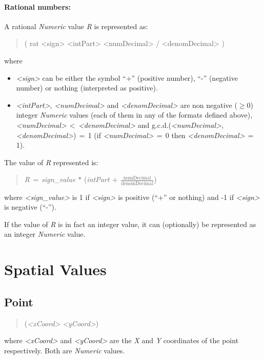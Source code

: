 \documentclass[english,a4paper]{article}
\begin{document}
\paragraph{Rational numbers:}

A rational \emph{Numeric} value \emph{R} is represented as:

\begin{quotation}
( rat <sign> <intPart> <numDecimal> / <denomDecimal> )
\end{quotation}
where

\begin{itemize}
\item \emph{<sign>} can be either the symbol {}``+'' (positive number),
{}``-'' (negative number) or nothing (interpreted as positive).
\item \emph{<intPart>}, \emph{<numDecimal>} and \emph{<denomDecimal>} are
non negative ($\geq 0$) integer \emph{Numeric} values (each of them
in any of the formats defined above), \emph{<numDecimal>}$\, <\, $\emph{<denomDecimal>}
and g.c.d.(\emph{<numDecimal>}, \emph{<denomDecimal>})$\, =\, $1
(if \emph{<numDecimal>}$\, =\, $0 then \emph{<denomDecimal>}$\, =\, $1).
\end{itemize}
The value of \emph{R} represented is:

\begin{quotation}
\emph{R}$\, =\, $\emph{sign\_value $*$} (\emph{intPart}$\, +\, \frac{\textrm{numDecimal}}{\textrm{denomDecimal}}$)
\end{quotation}
where \emph{<sign\_value>} is 1 if \emph{<sign>} is positive ({}``+''
or nothing) and -1 if \emph{<sign>} is negative ({}``-'').

If the value of \emph{R} is in fact an integer value, it can (optionally)
be represented as an integer \emph{Numeric} value.


\section{Spatial Values}


\subsection{Point}

\begin{quotation}
(\emph{<xCoord>} \emph{<yCoord>})
\end{quotation}
where \emph{<xCoord>} and \emph{<yCoord>} are the \emph{X} and \emph{Y}
coordinates of the point respectively. Both are \emph{Numeric} values.
\end{document}
